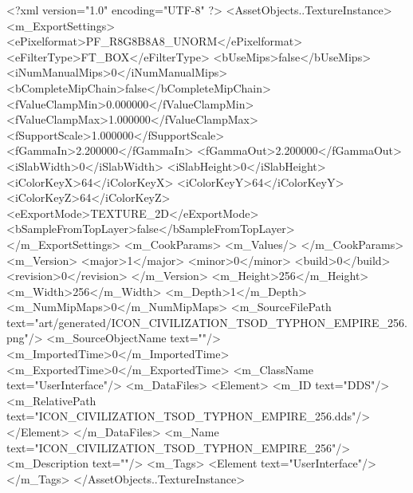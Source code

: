 <?xml version="1.0" encoding="UTF-8" ?>
<AssetObjects..TextureInstance>
	<m_ExportSettings>
		<ePixelformat>PF_R8G8B8A8_UNORM</ePixelformat>
		<eFilterType>FT_BOX</eFilterType>
		<bUseMips>false</bUseMips>
		<iNumManualMips>0</iNumManualMips>
		<bCompleteMipChain>false</bCompleteMipChain>
		<fValueClampMin>0.000000</fValueClampMin>
		<fValueClampMax>1.000000</fValueClampMax>
		<fSupportScale>1.000000</fSupportScale>
		<fGammaIn>2.200000</fGammaIn>
		<fGammaOut>2.200000</fGammaOut>
		<iSlabWidth>0</iSlabWidth>
		<iSlabHeight>0</iSlabHeight>
		<iColorKeyX>64</iColorKeyX>
		<iColorKeyY>64</iColorKeyY>
		<iColorKeyZ>64</iColorKeyZ>
		<eExportMode>TEXTURE_2D</eExportMode>
		<bSampleFromTopLayer>false</bSampleFromTopLayer>
	</m_ExportSettings>
	<m_CookParams>
		<m_Values/>
	</m_CookParams>
	<m_Version>
		<major>1</major>
		<minor>0</minor>
		<build>0</build>
		<revision>0</revision>
	</m_Version>
	<m_Height>256</m_Height>
	<m_Width>256</m_Width>
	<m_Depth>1</m_Depth>
	<m_NumMipMaps>0</m_NumMipMaps>
	<m_SourceFilePath text="art/generated/ICON_CIVILIZATION_TSOD_TYPHON_EMPIRE_256.png"/>
	<m_SourceObjectName text=""/>
	<m_ImportedTime>0</m_ImportedTime>
	<m_ExportedTime>0</m_ExportedTime>
	<m_ClassName text="UserInterface"/>
	<m_DataFiles>
		<Element>
			<m_ID text="DDS"/>
			<m_RelativePath text="ICON_CIVILIZATION_TSOD_TYPHON_EMPIRE_256.dds"/>
		</Element>
	</m_DataFiles>
	<m_Name text="ICON_CIVILIZATION_TSOD_TYPHON_EMPIRE_256"/>
	<m_Description text=""/>
	<m_Tags>
		<Element text="UserInterface"/>
	</m_Tags>
</AssetObjects..TextureInstance>
